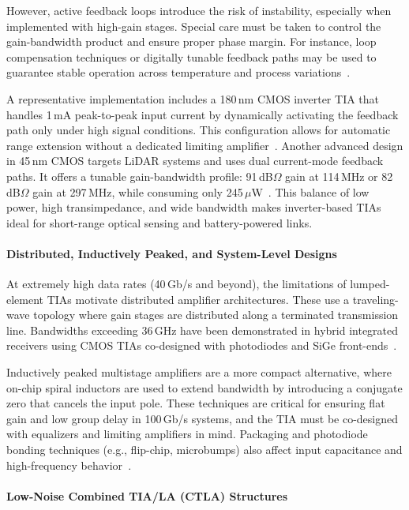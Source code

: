 \documentclass[11pt]{article}
\begin{document}
However, active feedback loops introduce the risk of instability, especially when implemented with high-gain stages. Special care must be taken to control the gain-bandwidth product and ensure proper phase margin. For instance, loop compensation techniques or digitally tunable feedback paths may be used to guarantee stable operation across temperature and process variations~\cite{inverter_mdpi2}.

A representative implementation includes a 180\,nm CMOS inverter TIA that handles 1\,mA peak-to-peak input current by dynamically activating the feedback path only under high signal conditions. This configuration allows for automatic range extension without a dedicated limiting amplifier~\cite{inverter_mdpi3}. Another advanced design in 45\,nm CMOS targets LiDAR systems and uses dual current-mode feedback paths. It offers a tunable gain-bandwidth profile: 91\,dB$\Omega$ gain at 114\,MHz or 82\,dB$\Omega$ gain at 297\,MHz, while consuming only 245\,$\mu$W~\cite{inverter_45nm_bohrium}. This balance of low power, high transimpedance, and wide bandwidth makes inverter-based TIAs ideal for short-range optical sensing and battery-powered links.

\paragraph{Distributed, Inductively Peaked, and System-Level Designs}

At extremely high data rates (40\,Gb/s and beyond), the limitations of lumped-element TIAs motivate distributed amplifier architectures. These use a traveling-wave topology where gain stages are distributed along a terminated transmission line. Bandwidths exceeding 36\,GHz have been demonstrated in hybrid integrated receivers using CMOS TIAs co-designed with photodiodes and SiGe front-ends~\cite{receiver100gbps_optica}.

Inductively peaked multistage amplifiers are a more compact alternative, where on-chip spiral inductors are used to extend bandwidth by introducing a conjugate zero that cancels the input pole. These techniques are critical for ensuring flat gain and low group delay in 100\,Gb/s systems, and the TIA must be co-designed with equalizers and limiting amplifiers in mind. Packaging and photodiode bonding techniques (e.g., flip-chip, microbumps) also affect input capacitance and high-frequency behavior~\cite{compare}.

\paragraph{Low-Noise Combined TIA/LA (CTLA) Structures}
\end{document}
